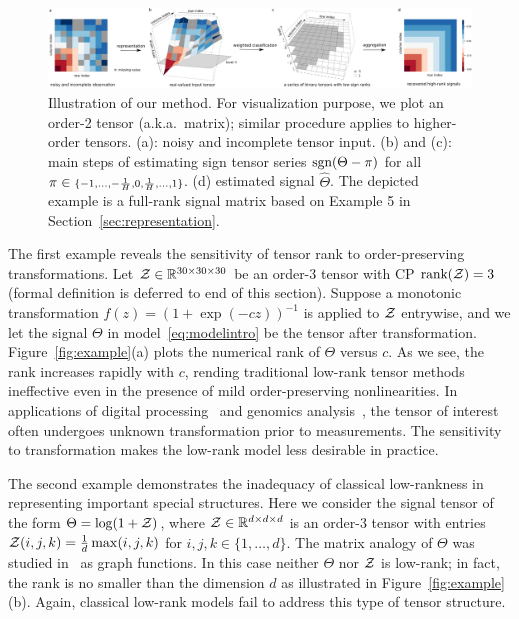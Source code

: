 \documentclass{article}
\theoremstyle{plain}
\theoremstyle{definition}
\def\sign{\textup{sgn}}
\begin{document}
\begin{figure}[h!]
\vspace{-.2cm}
\centerline{\includegraphics[width=1\textwidth]{figure/image_new2.pdf}}
\caption{Illustration of our method. For visualization purpose, we plot an order-2 tensor (a.k.a.\ matrix); similar procedure applies to higher-order tensors. (a): noisy and incomplete tensor input. (b) and (c): main steps of estimating sign tensor series $\sign(\Theta-\pi)$ for all $\pi\in {\scriptstyle  \{-1,\ldots,-{1\over H},0,{1\over H},\ldots,1\}}$. (d) estimated signal $\hat \Theta$. The depicted example is a full-rank signal matrix based on Example 5 in Section~\ref{sec:representation}.}\label{fig:demo}
\vspace{-.4cm}
\end{figure}

The first example reveals the sensitivity of tensor rank to order-preserving transformations. Let $\mathcal{Z} \in \mathbb{R}^{30\times 30\times 30}$ be an order-3 tensor with CP $\text{rank}(\mathcal{Z})=3$ (formal definition is deferred to end of this section). Suppose a monotonic transformation $f(z)=(1+\exp(-cz))^{-1}$ is applied to $\mathcal{Z}$ entrywise, and we let the signal $\Theta$ in model~\eqref{eq:modelintro} be the tensor after transformation. Figure~\ref{fig:example}(a) plots the numerical rank of $\Theta$ versus $c$. As we see, the rank increases rapidly with $c$, rending traditional low-rank tensor methods ineffective even in the presence of mild order-preserving nonlinearities. In applications of digital processing~\cite{karbasi2012robust} and genomics analysis~\cite{wang2019three}, the tensor of interest often undergoes unknown transformation prior to measurements. The sensitivity to transformation makes the low-rank model less desirable in practice. 

The second example demonstrates the inadequacy of classical low-rankness in representing important special structures. Here we consider the signal tensor of the form $\Theta=\log(1+\mathcal{Z})$, where $\mathcal{Z}\in\mathbb{R}^{d\times d\times d}$ is an order-3 tensor with entries $\mathcal{Z}(i,j,k)={1\over d}\max(i,j,k)$ for $i,j,k\in\{1,\ldots,d\}$. The matrix analogy of $\Theta$ was studied in~\citet{chan2014consistent} as graph functions. In this case neither $\Theta$ nor $\mathcal{Z}$ is low-rank; in fact, the rank is no smaller than the dimension $d$ as illustrated in Figure~\ref{fig:example}(b). Again, classical low-rank models fail to address this type of tensor structure. 
\end{document}
